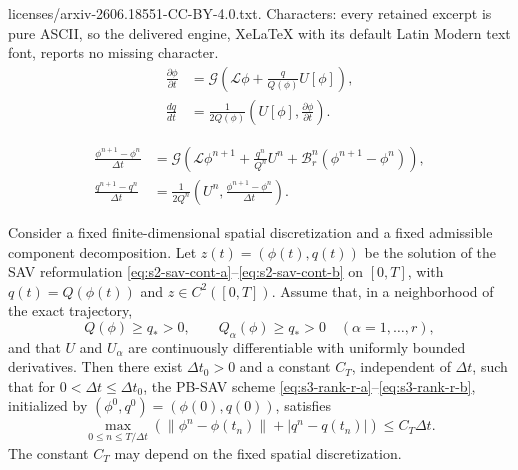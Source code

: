 \documentclass[10pt,a4paper]{amsart}
\begin{document}
licenses/arxiv-2606.18551-CC-BY-4.0.txt. Characters: every retained excerpt is pure ASCII, so the delivered engine, XeLaTeX with its default Latin Modern text font, reports no missing character.
\begin{align}
\frac{\partial \phi}{\partial t}
&=
\mathcal G\left(
\mathcal L\phi+\frac{q}{Q(\phi)}U[\phi]
\right),
\label{eq:s2-sav-cont-a}
\\
\frac{dq}{dt}
&=
\frac{1}{2Q(\phi)}
\left(
U[\phi],\frac{\partial \phi}{\partial t}
\right).
\label{eq:s2-sav-cont-b}
\end{align}

\begin{align}
\frac{\phi^{n+1}-\phi^n}{\Delta t}
&=
\mathcal G\left(
\mathcal L\phi^{n+1}
+
\frac{q^n}{Q^n}U^n
+
\mathcal B_r^n(\phi^{n+1}-\phi^n)
\right),
\label{eq:s3-rank-r-a}
\\
\frac{q^{n+1}-q^n}{\Delta t}
&=
\frac{1}{2Q^n}
\left(
U^n,\frac{\phi^{n+1}-\phi^n}{\Delta t}
\right).
\label{eq:s3-rank-r-b}
\end{align}

\begin{theorem}
\label{thm:first-order-convergence}
Consider a fixed finite-dimensional spatial discretization and a fixed
admissible component decomposition. Let
\(z(t)=(\phi(t),q(t))\) be the solution of the SAV reformulation
\eqref{eq:s2-sav-cont-a}--\eqref{eq:s2-sav-cont-b} on \([0,T]\), with
\(q(t)=Q(\phi(t))\) and \(z\in C^2([0,T])\). Assume that, in a neighborhood
of the exact trajectory,
\[
Q(\phi)\ge q_*>0,\qquad Q_\alpha(\phi)\ge q_*>0
\quad (\alpha=1,\ldots,r),
\]
and that \(U\) and \(U_\alpha\) are continuously differentiable with
uniformly bounded derivatives. Then there exist \(\Delta t_0>0\) and a
constant \(C_T\), independent of \(\Delta t\), such that for
\(0<\Delta t\le\Delta t_0\), the PB-SAV scheme
\eqref{eq:s3-rank-r-a}--\eqref{eq:s3-rank-r-b}, initialized by
\((\phi^0,q^0)=(\phi(0),q(0))\), satisfies
\[
\max_{0\le n\le T/\Delta t}
\left(\|\phi^n-\phi(t_n)\|+|q^n-q(t_n)|\right)
\le C_T\Delta t .
\]
The constant \(C_T\) may depend on the fixed spatial discretization.
\end{theorem}
\end{document}
